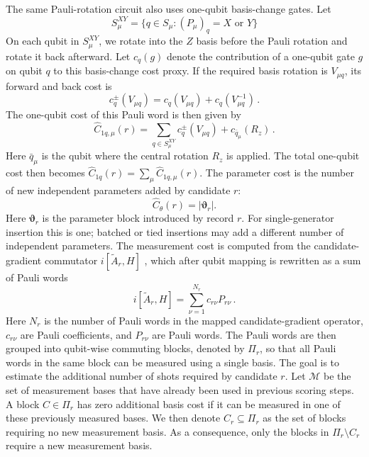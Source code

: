 \documentclass[
  reprint,
  amsmath,
  amssymb,
  aps,
  pra,
  nofootinbib,
  superscriptaddress,
  floatfix
]{revtex4-2}
\begin{document}
\noindent
The same Pauli-rotation circuit also uses one-qubit basis-change gates. Let
\[
S_{\mu}^{XY} = \{q\in S_{\mu}:(P_{\mu})_q = X\text{ or }Y\}
\]
On each qubit in \(S_{\mu}^{XY}\), we rotate into the \(Z\) basis before the Pauli rotation and rotate it back afterward. Let \(c_q(g)\) denote the contribution of a one-qubit gate \(g\) on qubit \(q\) to this basis-change cost proxy. If the required basis rotation is $V_{\mu q}$, its forward and back cost is
\[
c_q^{\pm}(V_{\mu q})=c_q(V_{\mu q})+c_q(V^{-1}_{\mu q})\,.
\]
The one-qubit cost of this Pauli word is then given by
%
\begin{equation*}
\widehat{C}_{1q,\mu}(r) = \sum_{q\in S_{\mu}^{XY}}c_q^\pm(V_{\mu q}) + c_{\bar{q}_{\mu}}(R_z)\,.
\end{equation*}
Here \(\bar{q}_{\mu}\) is the qubit where the central rotation \(R_z\) is applied. The total one-qubit cost then becomes \(\widehat{C}_{1q}(r)=\sum_\mu\widehat{C}_{1q,\mu}(r)\). The parameter cost is the number of new independent parameters added by candidate \(r\):
\begin{equation*}
\widehat C_\theta(r)
=
|\boldsymbol\vartheta_r|.
\end{equation*}
%
Here \(\boldsymbol\vartheta_r\) is the parameter block introduced by record
\(r\). For single-generator insertion this is one; batched or tied insertions
may add a different number of independent parameters. The measurement cost is
computed from the candidate-gradient commutator
\(i[\widetilde A_r,H]\)
\cite{Verteletskyi2020CliqueCover,Yen2020CompatibleMeasurements}, which after
qubit mapping is rewritten as a sum of Pauli words
%
\[
i[\widetilde A_r,H]=\sum_{\nu=1}^{N_r}c_{r\nu}P_{r\nu}\,.
\]
%
Here \(N_r\) is the number of Pauli words in the mapped candidate-gradient operator, \(c_{r\nu}\) are Pauli coefficients, and \(P_{r\nu}\) are Pauli words.
The Pauli words are then grouped into qubit-wise commuting blocks, denoted by \(\Pi_r\), so that all Pauli words in the same block can be measured using a single basis. The goal is to estimate the additional number of shots required by candidate \(r\). Let \(\mathcal M\) be the set of measurement bases that have already been used in previous scoring steps. A block \(C\in\Pi_r\) has zero additional basis cost if it can be measured in one of these previously measured bases. We then denote \(C_r\subseteq\Pi_r\) as the set of blocks requiring no new measurement basis. As a consequence, only the blocks in \(\Pi_r\setminus C_r\) require a new measurement basis.
\end{document}
